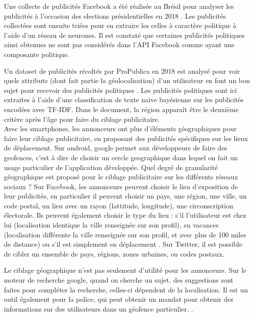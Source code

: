 \documentclass[runningheads]{llncs}
\begin{document}
Une collecte de publicités Facebook a été réalisée au Brésil pour analyser les publicités à l'occasion des elections présidentielles en 2018 \cite{silva_facebook_2020}. Les publicités collectées sont ensuite triées pour en extraire les celles à caractère politique à l'aide d'un réseau de neurones. Il est constaté que certaines publicités politiques ainsi obtenues ne sont pas considérés dans l'API Facebook comme ayant une composante politique. 

Un dataset de publicités récoltés par ProPublica en 2018 est analysé pour voir quels attributs (dont fait partie la géolocalisation) d'un utilisateur en font un bon sujet pour recevoir des publicités politiques \cite{levi_automatically_2020}. Les publicités politiques sont ici extraites à l'aide d'une classification de texte naïve bayésienne sur les publicités encodées avec TF-IDF. Dans le document, la région apparaît être le deuxième critère après l'âge pour faire du ciblage publicitaire. \\




Avec les smartphones, les annonceurs ont plus d'éléments géographiques pour faire leur ciblage publicitaire, en proposant des publicités spécifiques sur les lieux de déplacement. Sur android, google permet aux développeurs de faire des geofences, c'est à dire de choisir un cercle geographique dans lequel on fait un usage particulier de l'application développée. Quel degré de granularité géographique est proposé pour le ciblage publicitaire sur les différents réseaux sociaux ? Sur Facebook, les annonceurs peuvent choisir le lieu d'exposition de leur publicités, en particulier il peuvent choisir un pays, une région, une ville, un code postal, un lieu avec un rayon (lattitude, longitude), une circonscription électorale. Ils peuvent également choisir le type du lieu : s'il l'utilisateur est chez lui (localisation identique la ville renseignée sur son profil), en vacances (localisation différente la ville renseignée sur son profil, et avec plus de 100 miles de distance) ou s'il est simplement en déplacement \cite{noauthor_ciblage_nodate}. Sur Twitter, il est possible de cibler un ensemble de pays, régions, zones urbaines, ou codes postaux. 



Le ciblage géographique n'est pas seulement d'utilité pour les annonceurs. Sur le moteur de recherche google, quand on cherche un sujet, des suggestions sont faites pour compléter la recherche, celles-ci dépendent de la localisation. Il est un outil également pour la police, qui peut obtenir un mandat pour obtenir des informations sur des utilisateurs dans un géofence particulier. \cite{ng_how_nodate}.
\end{document}
